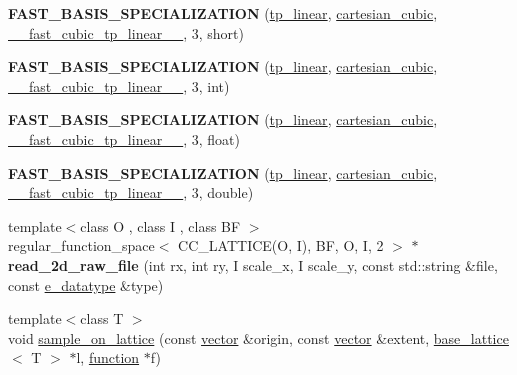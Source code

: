 \begin{DoxyCompactItemize}
{\bfseries F\+A\+S\+T\+\_\+\+B\+A\+S\+I\+S\+\_\+\+S\+P\+E\+C\+I\+A\+L\+I\+Z\+A\+T\+I\+ON} (\hyperlink{classsisl_1_1tp__linear}{tp\+\_\+linear}, \hyperlink{classsisl_1_1cartesian__cubic}{cartesian\+\_\+cubic}, \hyperlink{namespacesisl_a41665c7664aae419e4fa4154c7b2acc8}{\+\_\+\+\_\+fast\+\_\+cubic\+\_\+tp\+\_\+linear\+\_\+\+\_\+}, 3, short)
\item 
\mbox{\label{namespacesisl_aa63757b79e857499d8a22c4352bda314}} 
{\bfseries F\+A\+S\+T\+\_\+\+B\+A\+S\+I\+S\+\_\+\+S\+P\+E\+C\+I\+A\+L\+I\+Z\+A\+T\+I\+ON} (\hyperlink{classsisl_1_1tp__linear}{tp\+\_\+linear}, \hyperlink{classsisl_1_1cartesian__cubic}{cartesian\+\_\+cubic}, \hyperlink{namespacesisl_a41665c7664aae419e4fa4154c7b2acc8}{\+\_\+\+\_\+fast\+\_\+cubic\+\_\+tp\+\_\+linear\+\_\+\+\_\+}, 3, int)
\item 
\mbox{\label{namespacesisl_a585e64aca67403ff6a314670d7d9b53a}} 
{\bfseries F\+A\+S\+T\+\_\+\+B\+A\+S\+I\+S\+\_\+\+S\+P\+E\+C\+I\+A\+L\+I\+Z\+A\+T\+I\+ON} (\hyperlink{classsisl_1_1tp__linear}{tp\+\_\+linear}, \hyperlink{classsisl_1_1cartesian__cubic}{cartesian\+\_\+cubic}, \hyperlink{namespacesisl_a41665c7664aae419e4fa4154c7b2acc8}{\+\_\+\+\_\+fast\+\_\+cubic\+\_\+tp\+\_\+linear\+\_\+\+\_\+}, 3, float)
\item 
\mbox{\label{namespacesisl_a0c510cfd2fd41c64ea57a3e52e8412b8}} 
{\bfseries F\+A\+S\+T\+\_\+\+B\+A\+S\+I\+S\+\_\+\+S\+P\+E\+C\+I\+A\+L\+I\+Z\+A\+T\+I\+ON} (\hyperlink{classsisl_1_1tp__linear}{tp\+\_\+linear}, \hyperlink{classsisl_1_1cartesian__cubic}{cartesian\+\_\+cubic}, \hyperlink{namespacesisl_a41665c7664aae419e4fa4154c7b2acc8}{\+\_\+\+\_\+fast\+\_\+cubic\+\_\+tp\+\_\+linear\+\_\+\+\_\+}, 3, double)
\item 
\mbox{\label{namespacesisl_a7226c23f2b3fc3bfc30594977d6dec3f}} 
{\footnotesize template$<$class O , class I , class BF $>$ }\\regular\+\_\+function\+\_\+space$<$ C\+C\+\_\+\+L\+A\+T\+T\+I\+CE(O, I), BF, O, I, 2 $>$ $\ast$ {\bfseries read\+\_\+2d\+\_\+raw\+\_\+file} (int rx, int ry, I scale\+\_\+x, I scale\+\_\+y, const std\+::string \&file, const \hyperlink{namespacesisl_acb05df69c6b8f6d31074a5f4cec4baeb}{e\+\_\+datatype} \&type)
\item 
{\footnotesize template$<$class T $>$ }\\void \hyperlink{namespacesisl_aac0589ffc20d038475dc0b502cbcbfdf}{sample\+\_\+on\+\_\+lattice} (const \hyperlink{namespacesisl_a2069bd5374a9be042ff3ce3306d41e1a}{vector} \&origin, const \hyperlink{namespacesisl_a2069bd5374a9be042ff3ce3306d41e1a}{vector} \&extent, \hyperlink{classsisl_1_1base__lattice}{base\+\_\+lattice}$<$ T $>$ $\ast$l, \hyperlink{classsisl_1_1function}{function} $\ast$f)
\end{DoxyCompactItemize}


